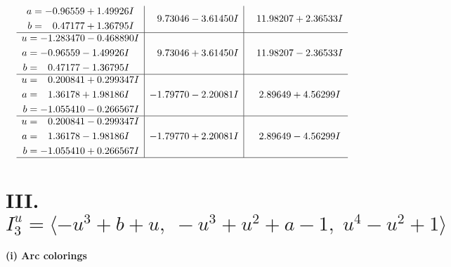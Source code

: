 \documentclass[1p]{elsarticle_modified}
\theoremstyle{definition}
\begin{document}
$$\begin{array}{c|c|c}
\begin{aligned}
a &= -0.96559 + 1.49926 I \\
b &= \phantom{-}0.47177 + 1.36795 I\end{aligned}
 & \phantom{-}9.73046 - 3.61450 I & \phantom{-}11.98207 + 2.36533 I \\ \hline\begin{aligned}
u &= -1.283470 - 0.468890 I \\
a &= -0.96559 - 1.49926 I \\
b &= \phantom{-}0.47177 - 1.36795 I\end{aligned}
 & \phantom{-}9.73046 + 3.61450 I & \phantom{-}11.98207 - 2.36533 I \\ \hline\begin{aligned}
u &= \phantom{-}0.200841 + 0.299347 I \\
a &= \phantom{-}1.36178 + 1.98186 I \\
b &= -1.055410 - 0.266567 I\end{aligned}
 & -1.79770 - 2.20081 I & \phantom{-}2.89649 + 4.56299 I \\ \hline\begin{aligned}
u &= \phantom{-}0.200841 - 0.299347 I \\
a &= \phantom{-}1.36178 - 1.98186 I \\
b &= -1.055410 + 0.266567 I\end{aligned}
 & -1.79770 + 2.20081 I & \phantom{-}2.89649 - 4.56299 I\\
 \hline 
 \end{array}$$\newpage\newpage\renewcommand{\arraystretch}{1}
\centering \section*{III. $I^u_{3}= \langle - u^3+b+u,\;- u^3+u^2+a-1,\;u^4- u^2+1 \rangle$}
\flushleft \textbf{(i) Arc colorings}\\
\end{document}
